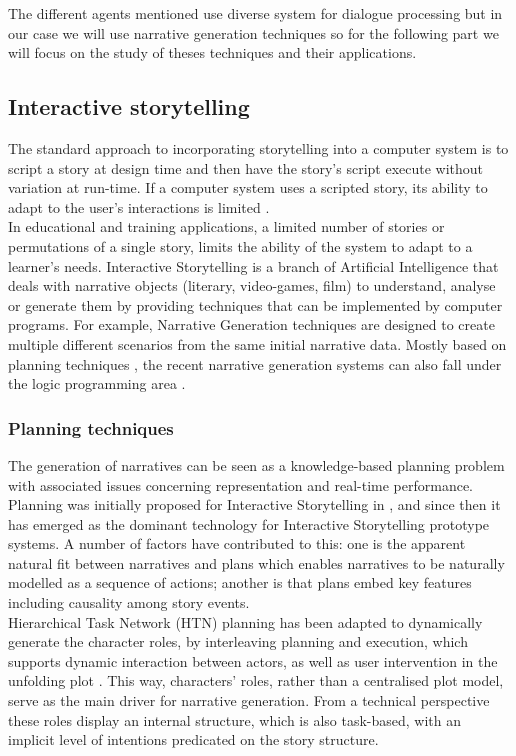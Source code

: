 \documentclass[11pt]{article}
\begin{document}

The different agents mentioned use diverse system for dialogue processing but in our case we will use narrative generation techniques so for the following part we will focus on the study of theses techniques and their applications.
\subsection{Interactive storytelling}
The standard approach to incorporating storytelling into a computer system is to script a story at design time and then have the story's script execute without variation at run-time. If a computer system uses a scripted story, its ability to adapt to the user's interactions is limited \citep{Riedl10}.\\

In educational and training applications, a limited number of stories or permutations of a single story, limits the ability of the system to adapt to a learner's needs. Interactive Storytelling is a branch of Artificial Intelligence that deals with narrative objects (literary, video-games, film) to understand, analyse or generate them by providing techniques that can be implemented by computer programs. For example, Narrative Generation techniques are designed to create multiple different scenarios from the same initial narrative data. Mostly based on planning techniques \citep{Young99}, the recent narrative generation systems can also fall under the logic programming area \citep{Bosser10}.
\subsubsection{Planning techniques}
The generation of narratives can be seen as a knowledge-based planning problem with associated issues concerning representation and real-time performance. Planning was initially proposed for Interactive Storytelling in \citep{Young99}, and since then it has emerged as the dominant technology for Interactive Storytelling prototype systems. A number of factors have contributed to this: one is the apparent natural fit between narratives and plans which enables narratives to be naturally modelled as a sequence of actions; another is that plans embed key features including causality among story events.\\

Hierarchical Task Network (HTN) planning \citep{Erol94} has been adapted to dynamically generate the character roles, by interleaving planning and execution, which supports dynamic interaction between actors, as well as user intervention in the unfolding plot \citep{Cavazza02}. This way, characters’ roles, rather than a centralised plot model, serve as the main driver for narrative generation. From a technical perspective these roles display an internal structure, which is also task-based, with an implicit level of intentions predicated on the story structure.\\
\end{document}
